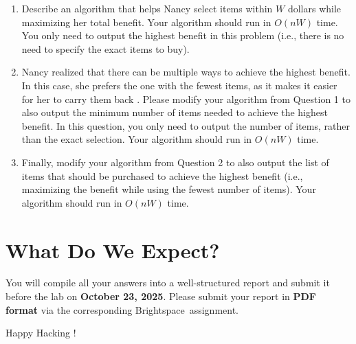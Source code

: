 \documentclass[12pt]{article}
\begin{document}
\begin{tcolorbox}[title=Questions]
    \begin{enumerate}
        \item Describe an algorithm that helps Nancy select items within $W$ dollars while maximizing her total benefit. Your algorithm should run in $O(nW)$ time. You only need to output the highest benefit in this problem (i.e., there is no need to specify the exact items to buy).

        \item Nancy realized that there can be multiple ways to achieve the highest benefit. In this case, she prefers the one with the fewest items, as it makes it easier for her to carry them back . Please modify your algorithm from Question 1 to also output the minimum number of items needed to achieve the highest benefit. In this question, you only need to output the number of items, rather than the exact selection. Your algorithm should run in $O(nW)$ time.

        \item Finally, modify your algorithm from Question 2 to also output the list of items that should be purchased to achieve the highest benefit (i.e., maximizing the benefit while using the fewest number of items). Your algorithm should run in $O(nW)$ time.
    \end{enumerate}
\end{tcolorbox}

\section{What Do We Expect?}
You will compile all your answers into a well-structured report and submit it before the lab on \textbf{October 23, 2025}. Please submit your report in \textbf{PDF format} via the corresponding Brightspace\texttrademark ~assignment.

\vspace{5mm}
Happy Hacking !
\end{document}
